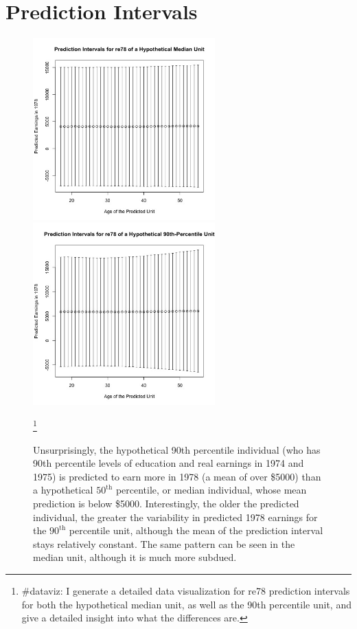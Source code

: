 \documentclass[11pt, oneside]{article}
\begin{document}
\section*{Prediction Intervals}
\begin{figure}[h]
	\includegraphics[width = 7cm, height = 7cm]{medianplot.jpg}
	\includegraphics[width = 7cm, height = 7cm]{ninetyplot.jpg}
	\caption{Unsurprisingly, the hypothetical 90th percentile individual (who has 90th percentile levels of education and real earnings in 1974 and 1975) is predicted to earn more in 1978 (a mean of over \$5000) than a hypothetical $50^\textrm{th}$ percentile, or median individual, whose mean prediction is below \$5000. Interestingly, the older the predicted individual, the greater the variability in predicted 1978 earnings for the $90^\textrm{th}$ percentile unit, although the mean of the prediction interval stays relatively constant. The same pattern can be seen in the median unit, although it is much more subdued.}\footnote{\#dataviz: I generate a detailed data visualization for re78 prediction intervals for both the hypothetical median unit, as well as the 90th percentile unit, and give a detailed insight into what the differences are.}
\end{figure}
\newpage
\end{document}
